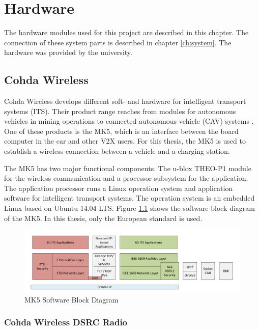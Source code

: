 \chapter{Hardware}\label{ch:hardware}

The hardware modules used for this project are described in this chapter. The connection of these system parts is described in chapter \ref{ch:system}. The hardware was provided by the university.

\section{Cohda Wireless}

Cohda Wireless develops different soft- and hardware for intelligent transport systems (ITS). Their product range reaches from modules for autonomous vehicles in mining operations to connected autonomous vehicle (CAV) systems \cite{cohda_wireless}. One of these products is the MK5, which is an interface between the board computer in the car and other V2X users. For this thesis, the MK5 is used to establish a wireless connection between a vehicle and a charging station.

The MK5 has two major functional components. The u-blox THEO-P1 module for the wireless communication and a processor subsystem for the application. The application processor runs a Linux operation system and application software for intelligent transport systems. The operation system is an embedded Linux based on Ubuntu 14.04 LTS. Figure \ref{fig:MK5_Stack} shows the software block diagram of the MK5. In this thesis, only the European standard is used. 

\begin{figure}[htb]
	\centering
	\includegraphics[width=1\textwidth]{images/MK5_Stack.png}
	\caption{MK5 Software Block Diagram \cite{MK5_Datasheet}}
	\label{fig:MK5_Stack}
\end{figure}

\newpage

\subsection{Cohda Wireless DSRC Radio}

